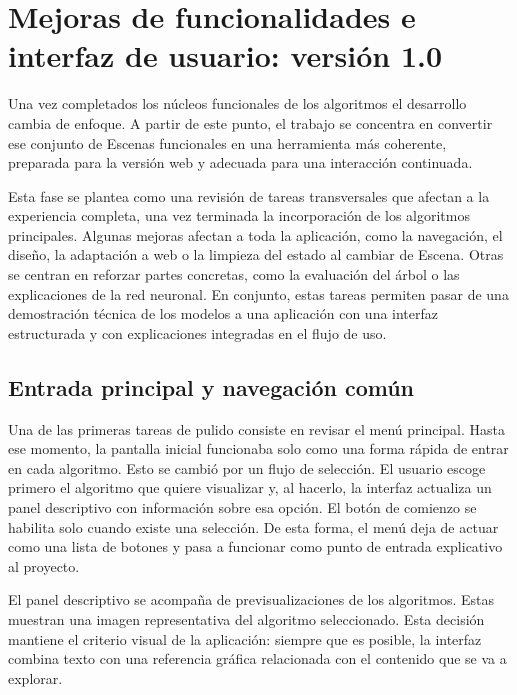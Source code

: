 \section{Mejoras de funcionalidades e interfaz de usuario: versión 1.0}

Una vez completados los núcleos funcionales de los algoritmos el desarrollo cambia de enfoque.
A partir de este punto, el trabajo se concentra en convertir ese conjunto de \gls{Escena}s funcionales en una herramienta más coherente, preparada para la versión web y adecuada para una interacción continuada.

Esta fase se plantea como una revisión de tareas transversales que afectan a la experiencia completa, una vez terminada la incorporación de los algoritmos principales.
Algunas mejoras afectan a toda la aplicación, como la navegación, el diseño, la adaptación a web o la limpieza del estado al cambiar de \gls{Escena}.
Otras se centran en reforzar partes concretas, como la evaluación del árbol o las explicaciones de la red neuronal.
En conjunto, estas tareas permiten pasar de una demostración técnica de los modelos a una aplicación con una interfaz estructurada y con explicaciones integradas en el flujo de uso.


\subsection{Entrada principal y navegación común}
\label{sec:entrada_principal_y_navegacion_comun}

Una de las primeras tareas de pulido consiste en revisar el menú principal.
Hasta ese momento, la pantalla inicial funcionaba solo como una forma rápida de entrar en cada algoritmo.
Esto se cambió por un flujo de selección.
El usuario escoge primero el algoritmo que quiere visualizar y, al hacerlo, la interfaz actualiza un panel descriptivo con información sobre esa opción.
El botón de comienzo se habilita solo cuando existe una selección.
De esta forma, el menú deja de actuar como una lista de botones y pasa a funcionar como punto de entrada explicativo al proyecto.

El panel descriptivo se acompaña de previsualizaciones de los algoritmos.
Estas muestran una imagen representativa del algoritmo seleccionado.
Esta decisión mantiene el criterio visual de la aplicación: siempre que es posible, la interfaz combina texto con una referencia gráfica relacionada con el contenido que se va a explorar.


